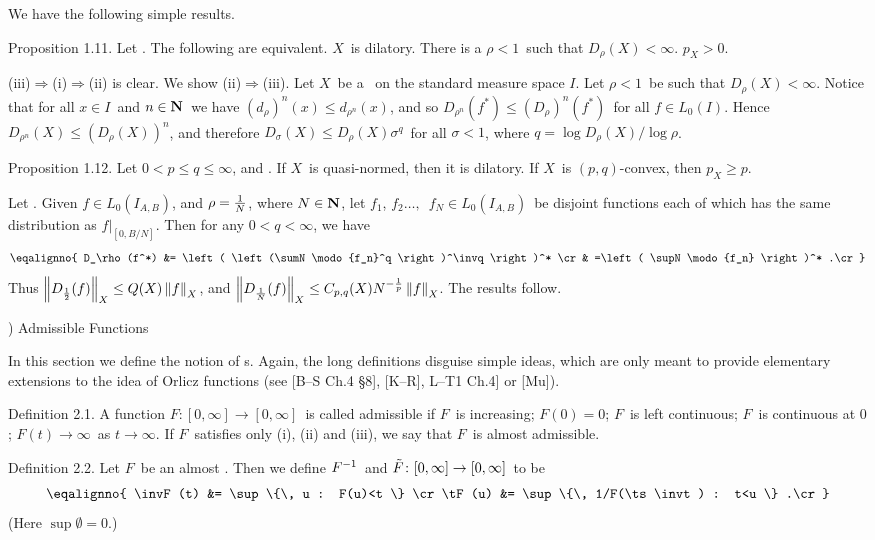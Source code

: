We have the following simple results.
 
\proclaim Proposition 1.11. Let \Xbaris. The following are equivalent.
\itemi $X$\ is dilatory.
\itemii There is a $\rho<1$\ such that $D_\rho(X)<\infty$.
\itemiii $p_X>0$.
 
\Proof (iii)$\Rightarrow$(i)$\Rightarrow$(ii) is clear. We show
(ii)$\Rightarrow$(iii). Let $X$\ be a \ris\ on the standard measure
space $I$.
Let $\rho<1$\ be such that $D_\rho(X)<\infty$. Notice that
for all $x\in I$\ and $n\in{\bf N}$\ we have $(d_\rho)^n(x) \le d_{\rho^n}(x)$,
and
so $D_{\rho^n}(f^*) \le (D_\rho)^n(f^*)$\ for all $f\in L_0(I)$.
Hence
$D_{\rho^n}(X) \le (D_\rho(X))^n$, and therefore $D_\sigma(X) \le
D_\rho(X)
\sigma^q$\ for all $\sigma<1$, where $q = \log D_\rho(X) \Big/ \log
\rho$.
\endproof
 
\proclaim Proposition 1.12. Let $0<p\le q\le\infty$, and \Xbaris.
If $X$\ is
quasi-normed, then it is dilatory. If $X$\ is $(p,q)$-convex, then
$p_X\ge p$.
 
\Proof Let \Xbaris\onIAB. Given $f\in L_0(I_{A,B})$, and $\rho={1\over N}$,
where
$N\in{\bf N}$, let $f_1$, $f_2\ldots,$\ $f_N \in L_0(I_{A,B})$\ be disjoint
functions
each of which has the same distribution as $f\big|_{[0,B/N]}$. Then
for any
$0<q<\infty$, we have
$$ \eqalignno{
   D_\rho(f^*)
   &= \left( \left(\sumN \modo{f_n}^q \right)^\invq \right)^* \cr
   & =\left( \supN \modo{f_n} \right)^* .\cr}$$
Thus $\left\| D_{1\over2}(f) \right\|_X \le Q(X) \left\| f \right\|_X$, and $\left\| D_{1\over N}(f) \right\|_X
\le
C_{p,q}(X) N^{-{1\over p}} \left\| f \right\|_X$. The results follow.
\endproof
 
\vfill
\eject
 
) Admissible Functions
 
In this section we define the notion of \af s. Again, the long definitions
disguise simple ideas, which are only meant to provide elementary
extensions to
the idea of Orlicz functions (see [B--S Ch.4 \S8], [K--R], L--T1
Ch.4] or
[Mu]).
 
\proclaim Definition 2.1. A function $F\colon[0,\infty]\to[0,\infty]$\
is called
{\dt admissible} if
\itemi $F$\ is increasing;
\itemii $F(0)=0$;
\itemiii $F$\ is left continuous;
\itemiv $F$\ is continuous at $0$;
\itemv $F(t) \to \infty$\ as $t\to\infty$.
\moreproclaim\noindent
If $F$\ satisfies only (i), (ii) and (iii), we say that $F$\ is {\dt
almost
admissible}.
 
\proclaim Definition 2.2. Let $F$\ be an almost \af. Then we define
$F^{-1}$\ and
$\tilde F\colon[0,\infty]\to[0,\infty]$\ to be
$$ \eqalignno{
   \invF(t) &= \sup\{\, u : F(u)<t \} \cr
   \tF(u)   &= \sup\{\, 1/F(\ts\invt) : t<u \} .\cr}$$
(Here $\sup\emptyset = 0$.)
 
